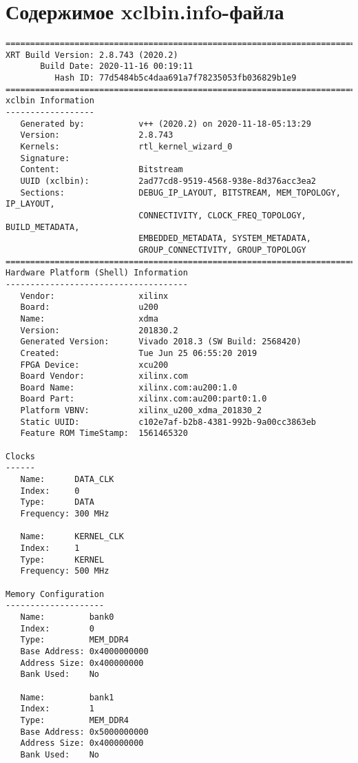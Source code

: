 \chapter{Содержимое xclbin.info-файла}
\label{cha:appendix1}
\begin{lstlisting}[label=func,breakatwhitespace=false,caption=Содержимое vinc.xclbin.info файла.]
==============================================================================
XRT Build Version: 2.8.743 (2020.2)
       Build Date: 2020-11-16 00:19:11
          Hash ID: 77d5484b5c4daa691a7f78235053fb036829b1e9
==============================================================================
xclbin Information
------------------
   Generated by:           v++ (2020.2) on 2020-11-18-05:13:29
   Version:                2.8.743
   Kernels:                rtl_kernel_wizard_0
   Signature:              
   Content:                Bitstream
   UUID (xclbin):          2ad77cd8-9519-4568-938e-8d376acc3ea2
   Sections:               DEBUG_IP_LAYOUT, BITSTREAM, MEM_TOPOLOGY, IP_LAYOUT, 
                           CONNECTIVITY, CLOCK_FREQ_TOPOLOGY, BUILD_METADATA, 
                           EMBEDDED_METADATA, SYSTEM_METADATA, 
                           GROUP_CONNECTIVITY, GROUP_TOPOLOGY
==============================================================================
Hardware Platform (Shell) Information
-------------------------------------
   Vendor:                 xilinx
   Board:                  u200
   Name:                   xdma
   Version:                201830.2
   Generated Version:      Vivado 2018.3 (SW Build: 2568420)
   Created:                Tue Jun 25 06:55:20 2019
   FPGA Device:            xcu200
   Board Vendor:           xilinx.com
   Board Name:             xilinx.com:au200:1.0
   Board Part:             xilinx.com:au200:part0:1.0
   Platform VBNV:          xilinx_u200_xdma_201830_2
   Static UUID:            c102e7af-b2b8-4381-992b-9a00cc3863eb
   Feature ROM TimeStamp:  1561465320

Clocks
------
   Name:      DATA_CLK
   Index:     0
   Type:      DATA
   Frequency: 300 MHz

   Name:      KERNEL_CLK
   Index:     1
   Type:      KERNEL
   Frequency: 500 MHz

Memory Configuration
--------------------
   Name:         bank0
   Index:        0
   Type:         MEM_DDR4
   Base Address: 0x4000000000
   Address Size: 0x400000000
   Bank Used:    No

   Name:         bank1
   Index:        1
   Type:         MEM_DDR4
   Base Address: 0x5000000000
   Address Size: 0x400000000
   Bank Used:    No


\end{lstlisting}
